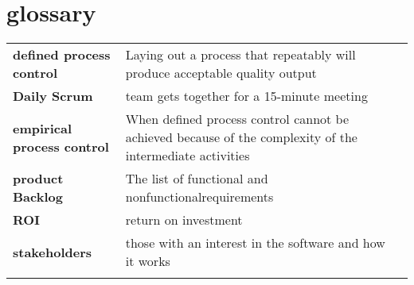 \section*{glossary}

\begin{table}[H]
  \begin{tabular}{lll}
    \textbf{defined process control} &  Laying out a process that repeatably will produce acceptable quality output\\
    \textbf{Daily Scrum} & team gets together for a 15-minute meeting\\
    \textbf{empirical process control} &  When defined process control cannot be achieved because of the complexity of the intermediate activities\\
    \textbf{product Backlog} & The list of functional
    and nonfunctionalrequirements\\
    \textbf{ROI} &  return on investment\\
    \textbf{stakeholders} &  those with an interest in the software and how it works\\
   & 
  \end{tabular}
\end{table}